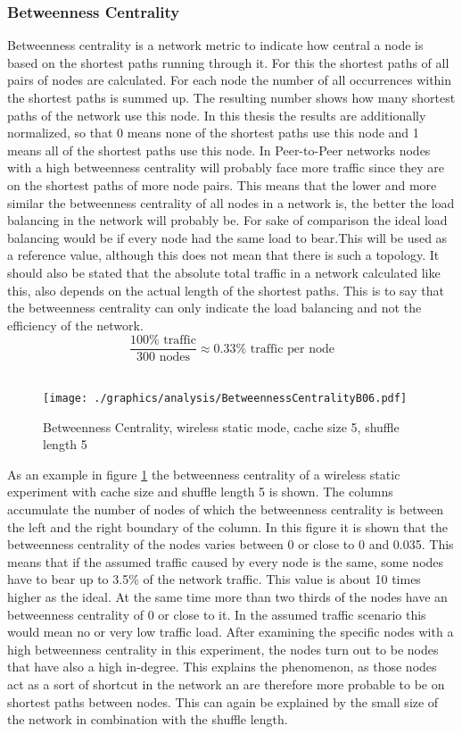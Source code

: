 \subsubsection{Betweenness Centrality}
Betweenness centrality is a network metric to indicate how central a node is
based on the shortest paths running through it. For this the shortest paths of
all pairs of nodes are calculated. For each node the number of all occurrences
within the shortest paths is summed up. The resulting number shows how many
shortest paths of the network use this node. In this thesis the results are
additionally normalized, so that 0 means none of the shortest paths use this
node and 1 means all of the shortest paths use this node. In Peer-to-Peer
networks nodes with a high betweenness centrality will probably face more
traffic since they are on the shortest paths of more node pairs. This means that
the lower and more similar the betweenness centrality of all nodes in a network
is, the better the load balancing in the network will probably be. For sake of
comparison the ideal load balancing would be if every node had the same load to
bear.This will be used as a reference value, although this does not mean that
there is such a topology. It should also be stated that the absolute total
traffic in a network calculated like this, also depends on the actual length of
the shortest paths. This is to say that the betweenness centrality can only
indicate the load balancing and not the efficiency of the network. \[\frac{100\%
\text{ traffic}}{300 \text{ nodes}} \approx 0.33\% \text{ traffic per node}\]\\

\begin{figure}
	\texttt{[image: ./graphics/analysis/BetweennessCentralityB06.pdf]}
	\caption{Betweenness Centrality, wireless static mode, cache size 5, shuffle
	length 5}
	\label{fig:betweennessB06}
\end{figure}

As an example in figure \ref{fig:betweennessB06} the betweenness centrality of a
wireless static experiment with cache size and shuffle length 5 is shown. The
columns accumulate the number of nodes of which the betweenness centrality is
between the left and the right boundary of the column. In this figure it is
shown that the betweenness centrality of the nodes varies between 0 or close to
0 and 0.035. This means that if the assumed traffic caused by every node is the
same, some nodes have to bear up to 3.5\% of the network traffic. This value is
about 10 times higher as the ideal. At the same time more than two thirds of
the nodes have an betweenness centrality of 0 or close to it. In the assumed
traffic scenario this would mean no or very low traffic load. After examining
the specific nodes with a high betweenness centrality in this experiment, the
nodes turn out to be nodes that have also a high in-degree.
This explains the phenomenon, as those nodes act as a sort of shortcut in the
network an are therefore more probable to be on shortest paths between nodes.
This can again be explained by the small size of the network in combination with
the shuffle length.\\

